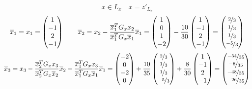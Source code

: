\documentclass{article}
\begin{document}
$$x \in L_x\quad x = z'_{L_x}$$
$$
    \overline{x}_1 = x_1 = \begin{pmatrix}
        1 \\ -1 \\ 2 \\ -1
    \end{pmatrix}\qquad \overline{x}_2 = x_2 - \frac{\overline{x}_1^TG_xx_2}{\overline{x}_1^TG_x\overline{x}_1}\overline{x}_1 = \begin{pmatrix}
        1 \\ 0 \\ 1 \\ -2
    \end{pmatrix} - \frac{10}{30}\begin{pmatrix}
        1 \\ -1 \\ 2 \\ -1
    \end{pmatrix} = \begin{pmatrix}
        \nicefrac{2}{3} \\ \nicefrac{1}{3} \\ \nicefrac{1}{3} \\ \nicefrac{-5}{3}
    \end{pmatrix}
$$
$$
    \overline{x}_3 = x_3 - \frac{\overline{x}_2^TG_xx_3}{\overline{x}_2^TG_x\overline{x}_2}\overline{x}_2 - \frac{\overline{x}_1^TG_xx_3}{\overline{x}_1^TG_x\overline{x}_1}\overline{x}_1 = \begin{pmatrix}
        -2 \\ 0 \\ -2 \\ 0
    \end{pmatrix} + \frac{10}{35}\begin{pmatrix}
        \nicefrac{2}{3} \\ \nicefrac{1}{3} \\ \nicefrac{1}{3} \\ \nicefrac{-5}{3}
    \end{pmatrix} + \frac{8}{30}\begin{pmatrix}
        1 \\ -1 \\ 2 \\ -1
    \end{pmatrix} = \begin{pmatrix}
        \nicefrac{-54}{35} \\ \nicefrac{-6}{35} \\ \nicefrac{-48}{35} \\ \nicefrac{-26}{35}
    \end{pmatrix}
$$
\end{document}
